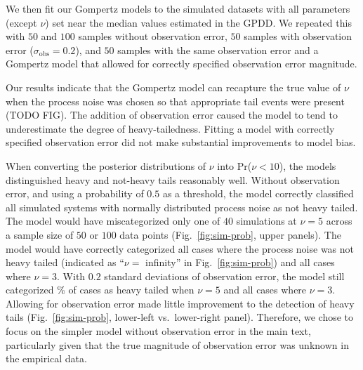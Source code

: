 We then fit our Gompertz models to the simulated datasets with all parameters (except $\nu$) set near the median values estimated in the GPDD. We repeated this with $50$ and $100$ samples without observation error, $50$ samples with observation error ($\sigma_\mathrm{obs} = 0.2$), and $50$ samples with the same observation error and a Gompertz model that allowed for correctly specified observation error magnitude.

Our results indicate that the Gompertz model can recapture the true value of $\nu$ when the process noise was chosen so that appropriate tail events were present (TODO FIG).
The addition of observation error caused the model to tend to underestimate the degree of heavy-tailedness. Fitting a model with correctly specified observation error did not make substantial improvements to model bias.


When converting the posterior distributions of $\nu$ into Pr($\nu < 10$), the models distinguished heavy and not-heavy tails reasonably well. Without observation error, and using a probability of $0.5$ as a threshold, the model correctly classified all simulated systems with normally distributed process noise as not heavy tailed. The model would have miscategorized only one of $40$ simulations at $\nu = 5$ across a sample size of $50$ or $100$ data points (Fig.~\ref{fig:sim-prob}, upper panels). The model would have correctly categorized all cases where the process noise was not heavy tailed (indicated as ``$\nu =$ infinity'' in Fig.~\ref{fig:sim-prob}) and all cases where $\nu = 3$. With $0.2$ standard deviations of observation error, the model still categorized \obsErrorNuFivePerc\% of cases as heavy tailed when $\nu = 5$ and all cases where $\nu = 3$. Allowing for observation error made little improvement to the detection of heavy tails (Fig.~\ref{fig:sim-prob}, lower-left vs.\ lower-right panel). Therefore, we chose to focus on the simpler model without observation error in the main text, particularly given that the true magnitude of observation error was unknown in the empirical data.

